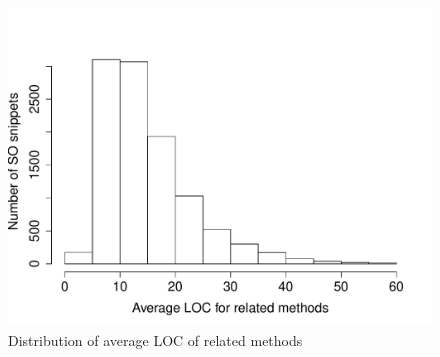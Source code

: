 \begin{figure}
	\includegraphics[scale=0.4]{figures/dist-loc.pdf}
	\caption{Distribution of average LOC of related methods}
	\label{fig:avg-loc}
\end{figure}

